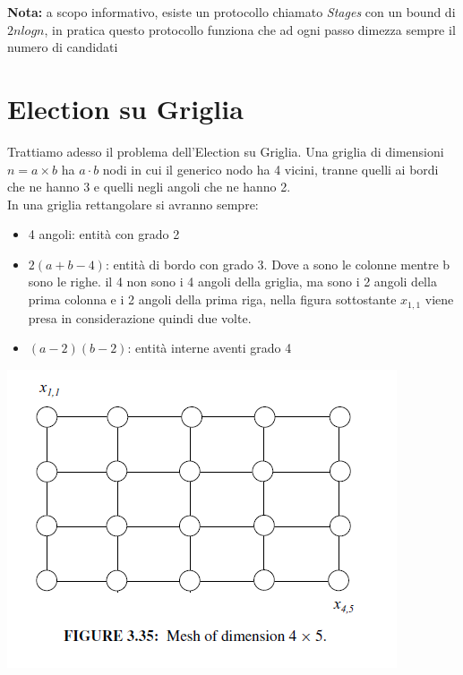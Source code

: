 
\begin{footnotesize}
    \textbf{Nota: }
    a scopo informativo, esiste un protocollo chiamato \emph{Stages} con un bound
    di $2n log n$, in pratica questo protocollo funziona che ad ogni passo dimezza
    sempre il numero di candidati
\end{footnotesize}

\section{Election su Griglia}
Trattiamo adesso il problema dell'Election su Griglia. Una griglia di dimensioni
$n = a \times b$ ha $a \cdot b$ nodi in cui il generico nodo ha 4 vicini, tranne
quelli ai bordi che ne hanno 3 e quelli negli angoli che ne hanno 2.\\
In una griglia rettangolare si avranno sempre:
\begin{itemize}
    \item 4 angoli: entità con grado 2
    \item $2(a+b-4)$: entità di bordo con grado 3. Dove a sono le colonne mentre b
          sono le righe. il 4 non sono i 4 angoli della griglia, ma sono i 2 angoli
          della prima colonna e i 2 angoli della prima riga, nella figura sottostante
          $x_{1,1}$ viene presa in considerazione quindi due volte.
    \item $(a-2)(b-2)$: entità interne aventi grado 4
\end{itemize}
\begin{center}
    \includegraphics[scale=0.7]{capitoli/leader-election/imgs/griglia.png}
\end{center}

